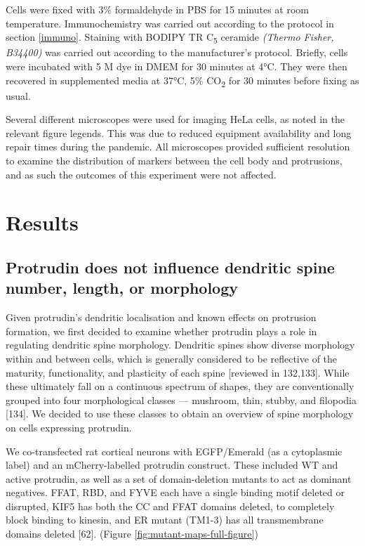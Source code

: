 \documentclass[
  12pt,
  a4paper,
]{book}
\begin{document}
Cells were fixed with 3\% formaldehyde in PBS for 15 minutes at room temperature. Immunochemistry was carried out according to the protocol in section \ref{immuno}. Staining with BODIPY TR C\textsubscript{5} ceramide \emph{(Thermo Fisher, B34400)} was carried out according to the manufacturer's protocol. Briefly, cells were incubated with 5 \textmu{}M dye in DMEM for 30 minutes at 4°C. They were then recovered in supplemented media at 37°C, 5\% CO\textsubscript{2} for 30 minutes before fixing as usual.

Several different microscopes were used for imaging HeLa cells, as noted in the relevant figure legends. This was due to reduced equipment availability and long repair times during the pandemic. All microscopes provided sufficient resolution to examine the distribution of markers between the cell body and protrusions, and as such the outcomes of this experiment were not affected.

\hypertarget{results-1}{%
\section{Results}\label{results-1}}

\hypertarget{protrudin-does-not-influence-dendritic-spine-number-length-or-morphology}{%
\subsection{Protrudin does not influence dendritic spine number, length, or morphology}\label{protrudin-does-not-influence-dendritic-spine-number-length-or-morphology}}

Given protrudin's dendritic localisation and known effects on protrusion formation, we first decided to examine whether protrudin plays a role in regulating dendritic spine morphology. Dendritic spines show diverse morphology within and between cells, which is generally considered to be reflective of the maturity, functionality, and plasticity of each spine {[}reviewed in 132,133{]}. While these ultimately fall on a continuous spectrum of shapes, they are conventionally grouped into four morphological classes --- mushroom, thin, stubby, and filopodia {[}134{]}. We decided to use these classes to obtain an overview of spine morphology on cells expressing protrudin.

We co-transfected rat cortical neurons with EGFP/Emerald (as a cytoplasmic label) and an mCherry-labelled protrudin construct. These included WT and active protrudin, as well as a set of domain-deletion mutants to act as dominant negatives. \textDelta{}FFAT, \textDelta{}RBD, and \textDelta{}FYVE each have a single binding motif deleted or disrupted, \textDelta{}KIF5 has both the CC and FFAT domains deleted, to completely block binding to kinesin, and \textDelta{}ER mutant (\textDelta{}TM1-3) has all transmembrane domains deleted {[}62{]}. (Figure \ref{fig:mutant-maps-full-figure})
\end{document}
